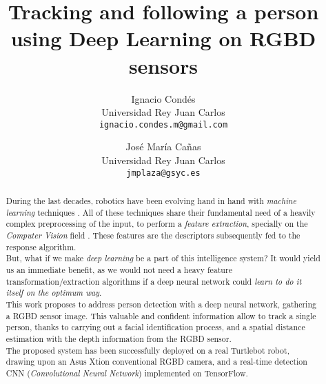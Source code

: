 \documentclass[11pt, a4paper]{article}
\title{Tracking and following a person using Deep Learning on RGBD sensors}
\author{Ignacio Condés \\
		Universidad Rey Juan Carlos \\
		\texttt{ignacio.condes.m@gmail.com} \and José María Cañas \\
		Universidad Rey Juan Carlos\\
		\texttt{jmplaza@gsyc.es}}
\begin{document}
	\maketitle
	
	\begin{abstract}
		During the last decades, robotics have been evolving hand in hand with \emph{machine learning} techniques \cite{speech-pattern-recognition} \cite{slam-feature-extraction}. All of these techniques share their fundamental need of a heavily complex preprocessing of the input, to perform a \emph{feature extraction}, specially on the \emph{Computer Vision}  field \cite[pp.~30--38]{slam-feature-extraction}. These features are the descriptors subsequently fed to the response algorithm.\\
		
		But, what if we make \emph{deep learning} be a part of this intelligence system? It would yield us an immediate benefit, as we would not need a heavy feature transformation/extraction algorithms if a deep neural network could \emph{learn to do it itself on the optimum way}.\\
		
		This work proposes to address person detection with a deep neural network, gathering  a RGBD sensor image. This valuable and confident information allow to track a single person, thanks to carrying out a facial identification process, and a spatial distance estimation with the depth information from the RGBD sensor.\\
		
		The proposed system has been successfully deployed on a real Turtlebot robot, drawing upon an Asus Xtion conventional RGBD camera, and a real-time detection CNN (\emph{Convolutional Neural Network}) implemented on TensorFlow.
	\end{abstract}
	
	
	
	

	

	
	
	
\end{document}
